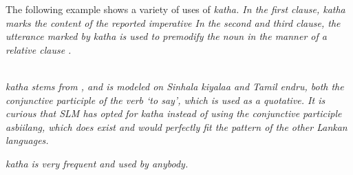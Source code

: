 The following example shows a variety of uses of \em katha\em. In the first clause, \em katha \em marks the content of the reported imperative 
In the second and third clause, the utterance marked by \em katha \em is used to premodify the noun  in the manner of a relative clause .


 \\
\em katha \em stems from , and is modeled on Sinhala \em kiyalaa \em and Tamil \em endru\em, both the conjunctive participle of the verb `to say', which is used as a quotative. It is curious that SLM has opted for \em katha \em instead of using the conjunctive participle \em asbiilang\em, which does exist and would perfectly fit the pattern of the other Lankan languages.

\em katha \em is very frequent and used by anybody.






